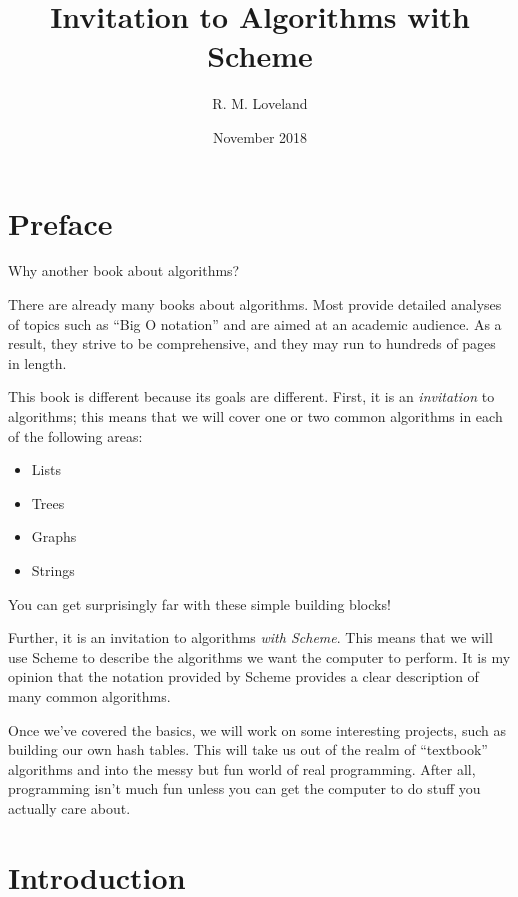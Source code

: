 \documentclass[12pt,openright,draft]{book}
\begin{document}
\title{Invitation to Algorithms with Scheme}
\author{R. M. Loveland}
\date{November 2018}

\frontmatter{}
\maketitle{}

\tableofcontents{}

\chapter{Preface}

Why another book about algorithms?

There are already many books about algorithms.  Most provide detailed
analyses of topics such as ``Big O notation'' and are aimed at an
academic audience.  As a result, they strive to be comprehensive, and
they may run to hundreds of pages in length.

This book is different because its goals are different.  First, it is
an \emph{invitation} to algorithms; this means that we will cover one or
two common algorithms in each of the following areas:

\begin{itemize}
\item Lists
\item Trees
\item Graphs
\item Strings
\end{itemize}

You can get surprisingly far with these simple building blocks!

Further, it is an invitation to algorithms \emph{with Scheme}.  This
means that we will use Scheme to describe the algorithms we want the
computer to perform.  It is my opinion that the notation provided by
Scheme provides a clear description of many common algorithms.

Once we've covered the basics, we will work on some interesting
projects, such as building our own hash tables.  This will take us out
of the realm of ``textbook'' algorithms and into the messy but fun world
of real programming.  After all, programming isn't much fun unless you
can get the computer to do stuff you actually care about.

\chapter{Introduction}
\end{document}
